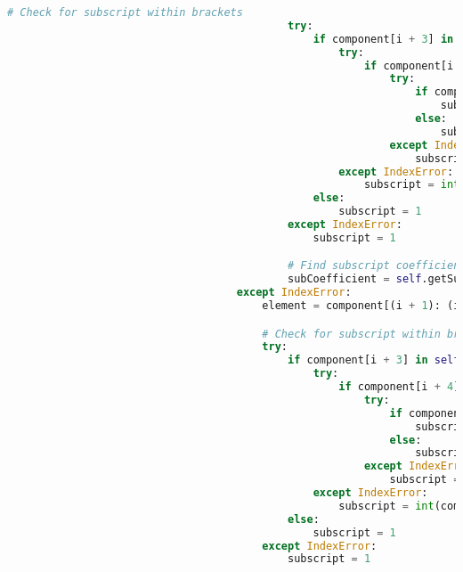 \documentclass[a4paper,12pt]{article}
\begin{document}
\begin{lstlisting}[language=Python, caption=parseComponent method for finding elements, label={lst:parsecomponent}]
                                            # Check for subscript within brackets
                                            try:
                                                if component[i + 3] in self.integers:
                                                    try:
                                                        if component[i + 4] in self.integers:
                                                            try:
                                                                if component[i + 5] in self.integers:
                                                                    subscript = int(component[(i + 3): (i + 6)])
                                                                else:
                                                                    subscript = int(component[(i + 3): (i + 5)])
                                                            except IndexError:
                                                                subscript = int(component[(i + 3): (i + 5)])
                                                    except IndexError:
                                                        subscript = int(component[i + 3])
                                                else:
                                                    subscript = 1
                                            except IndexError:
                                                subscript = 1

                                            # Find subscript coefficient of complex ion
                                            subCoefficient = self.getSubCoefficient(component)
                                    except IndexError:
                                        element = component[(i + 1): (i + 3)]

                                        # Check for subscript within brackets
                                        try:
                                            if component[i + 3] in self.integers:
                                                try:
                                                    if component[i + 4] in self.integers:
                                                        try:
                                                            if component[i + 5] in self.integers:
                                                                subscript = int(component[(i + 3): (i + 6)])
                                                            else:
                                                                subscript = int(component[(i + 3): (i + 5)])
                                                        except IndexError:
                                                            subscript = int(component[(i + 3): (i + 5)])
                                                except IndexError:
                                                    subscript = int(component[i + 3])
                                            else:
                                                subscript = 1
                                        except IndexError:
                                            subscript = 1


\end{lstlisting}
\end{document}
